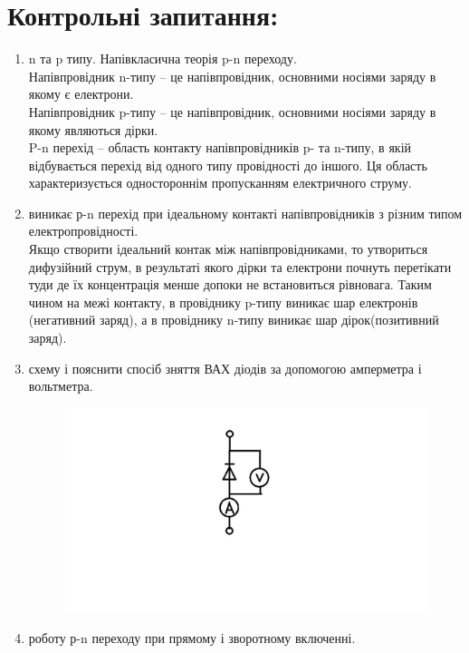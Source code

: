 \documentclass[12pt]{article}
\begin{document}
\section{Контрольні запитання:}
\begin{enumerate}
    \item {
         n та p типу. Напівкласична теорія p-n переходу.}\\
    Напівпровідник n-типу -- це напівпровідник, основними носіями заряду в якому є електрони.\\
    Напівпровідник p-типу -- це напівпровідник, основними носіями заряду в якому являються дірки.\\
    P-n перехід -- область контакту напівпровідників p- та n-типу, в якій відбувається перехід від одного типу провідності до іншого. Ця область характеризується одностороннім пропусканням електричного струму.
    \item
        { виникає р-n перехід при ідеальному контакті напівпровідників з
різним типом електропровідності.}\\
    Якщо створити ідеальний контак між напівпровідниками, то утвориться дифузійний струм, в результаті якого дірки та електрони почнуть перетікати туди де їх концентрація менше допоки не встановиться рівновага. Таким чином на межі контакту, в провіднику p-типу виникає шар електронів (негативний заряд), а в провіднику n-типу виникає шар дірок(позитивний заряд).
    \item
        { схему і пояснити спосіб зняття ВАХ діодів за допомогою
амперметра і вольтметра.}
    \begin{figure}[!ht]
      \centering
      \includegraphics[scale=0.6]{VAC.jpg}
    \end{figure}
    \item
        { роботу р-n переходу при прямому і зворотному включенні.}\\

\end{enumerate}
\end{document}
